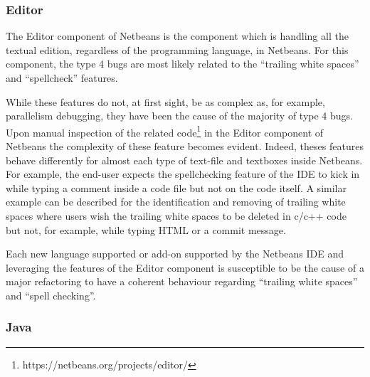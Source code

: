 \documentclass[12pt]{report}
\begin{document}
\subsubsection{Editor}\label{editor}

The Editor component of Netbeans is the component which is handling all
the textual edition, regardless of the programming language, in
Netbeans. For this component, the type 4 bugs are most likely related to
the ``trailing white spaces'' and ``spellcheck'' features.

While these features do not, at first sight, be as complex as, for
example, parallelism debugging, they have been the cause of the majority
of type 4 bugs. Upon manual inspection of the related
code\footnote{https://netbeans.org/projects/editor/} in the Editor
component of Netbeans the complexity of these feature becomes evident.
Indeed, theses features behave differently for almost each type of
text-file and textboxes inside Netbeans. For example, the end-user
expects the spellchecking feature of the IDE to kick in while typing a
comment inside a code file but not on the code itself. A similar example
can be described for the identification and removing of trailing white
spaces where users wish the trailing white spaces to be deleted in c/c++
code but not, for example, while typing HTML or a commit message.

Each new language supported or add-on supported by the Netbeans IDE and
leveraging the features of the Editor component is susceptible to be the
cause of a major refactoring to have a coherent behaviour regarding
``trailing white spaces'' and ``spell checking''.

\subsubsection{Java}\label{java}
\end{document}
